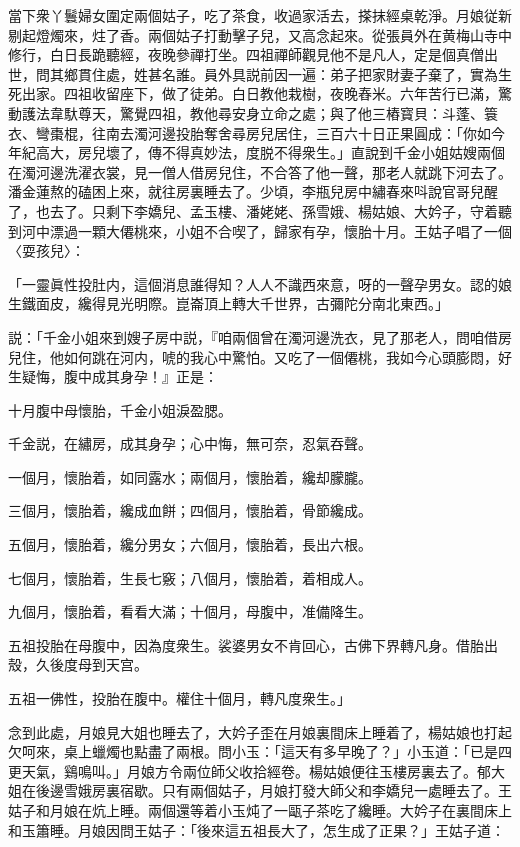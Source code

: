 當下衆丫鬟婦女圍定兩個姑子，吃了茶食，收過家活去，搽抹經桌乾淨。月娘従新剔起燈燭來，炷了香。兩個姑子打動擊子兒，又高念起來。從張員外在黄梅山寺中修行，白日長跪聽經，夜晚參禪打坐。四祖禪師觀見他不是凡人，定是個真僧出世，問其鄉貫住處，姓甚名誰。員外具説前因一遍：弟子把家財妻子棄了，實為生死出家。四祖收留座下，做了徒弟。白日教他栽樹，夜晚舂米。六年苦行已滿，驚動護法韋馱尊天，驚覺四祖，教他尋安身立命之處；與了他三樁寳貝：斗蓬、簑衣、彎棗棍，往南去濁河邊投胎奪舍尋房兒居住，三百六十日正果圓成：「你如今年紀高大，房兒壞了，傳不得真妙法，度脱不得衆生。」直說到千金小姐姑嫂兩個在濁河邊洗濯衣裳，見一僧人借房兒住，不合答了他一聲，那老人就跳下河去了。潘金蓮熬的磕困上來，就往房裏睡去了。少頃，李瓶兒房中繡春來呌說官哥兒醒了，也去了。只剩下李嬌兒、孟玉樓、潘姥姥、孫雪娥、楊姑娘、大妗子，守着聽到河中漂過一顆大僊桃來，小姐不合喫了，歸家有孕，懷胎十月。王姑子唱了一個〈耍孩兒〉：

「一靈眞性投肚内，這個消息誰得知？人人不識西來意，呀的一聲孕男女。認的娘生鐵面皮，纔得見光明際。崑崙頂上轉大千世界，古彌陀分南北東西。」

説：「千金小姐來到嫂子房中説，『咱兩個曾在濁河邊洗衣，見了那老人，問咱借房兒住，他如何跳在河内，唬的我心中驚怕。又吃了一個僊桃，我如今心頭膨悶，好生疑悔，腹中成其身孕！』正是：

十月腹中母懷胎，千金小姐淚盈腮。

千金説，在繡房，成其身孕；心中悔，無可奈，忍氣吞聲。

一個月，懷胎着，如同露水；兩個月，懷胎着，纔却朦朧。

三個月，懷胎着，纔成血餅；四個月，懷胎着，骨節纔成。

五個月，懷胎着，纔分男女；六個月，懷胎着，長出六根。

七個月，懷胎着，生長七竅；八個月，懷胎着，着相成人。

九個月，懷胎着，看看大滿；十個月，母腹中，准備降生。

五祖投胎在母腹中，因為度衆生。裟婆男女不肯回心，古佛下界轉凡身。借胎出殼，久後度母到天宫。

五祖一佛性，投胎在腹中。權住十個月，轉凡度衆生。」

念到此處，月娘見大姐也睡去了，大妗子歪在月娘裏間床上睡着了，楊姑娘也打起欠呵來，桌上蠟燭也點盡了兩根。問小玉：「這天有多早晚了？」小玉道：「已是四更天氣，鷄鳴叫。」月娘方令兩位師父收拾經卷。楊姑娘便往玉樓房裏去了。郁大姐在後邊雪娥房裏宿歇。只有兩個姑子，月娘打發大師父和李嬌兒一處睡去了。王姑子和月娘在炕上睡。兩個還等着小玉炖了一甌子茶吃了纔睡。大妗子在裏間床上和玉簫睡。月娘因問王姑子：「後來這五祖長大了，怎生成了正果？」王姑子道：

